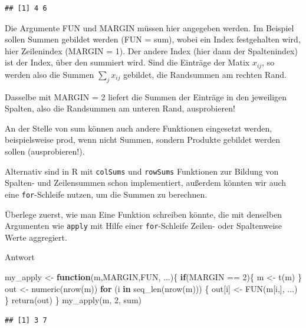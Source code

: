 \documentclass[
]{book}
\newenvironment{Shaded}{\begin{snugshade}}{\end{snugshade}}
\newcommand{\ControlFlowTok}[1]{\textcolor[rgb]{0.13,0.29,0.53}{\textbf{#1}}}
\newcommand{\DecValTok}[1]{\textcolor[rgb]{0.00,0.00,0.81}{#1}}
\newcommand{\FunctionTok}[1]{\textcolor[rgb]{0.00,0.00,0.00}{#1}}
\newcommand{\NormalTok}[1]{#1}
\newcommand{\OtherTok}[1]{\textcolor[rgb]{0.56,0.35,0.01}{#1}}
\newcommand{\SpecialCharTok}[1]{\textcolor[rgb]{0.00,0.00,0.00}{#1}}
\begin{document}
\begin{verbatim}
## [1] 4 6
\end{verbatim}

Die Argumente FUN und MARGIN müssen hier angegeben werden. Im Beispiel sollen Summen gebildet werden (FUN = sum), wobei ein Index festgehalten wird, hier Zeilenindex (MARGIN = 1). Der andere Index (hier dann der Spaltenindex) ist der Index, über den summiert wird. Sind die Einträge der Matix \(x_{ij}\), so werden also die Summen \(\sum_j x_{ij}\) gebildet, die Randsummen am rechten Rand.

Dasselbe mit MARGIN = 2 liefert die Summen der Einträge in den jeweiligen Spalten, also die Randsummen am unteren Rand, ausprobieren!

An der Stelle von sum können auch andere Funktionen eingesetzt werden, beispielsweise prod, wenn nicht Summen, sondern Produkte gebildet werden sollen (ausprobieren!).

Alternativ sind in R mit \texttt{colSums} und \texttt{rowSums} Funktionen zur Bildung von Spalten- und Zeilensummen schon implementiert, außerdem könnten wir auch eine \texttt{for}-Schleife nutzen, um die Summen zu berechnen.

Überlege zuerst, wie man Eine Funktion schreiben könnte, die mit denselben Argumenten wie \texttt{apply} mit Hilfe einer \texttt{for}-Schleife Zeilen- oder Spaltenweise Werte aggregiert.

Antwort

\begin{Shaded}
\begin{Highlighting}[]
\NormalTok{my\_apply }\OtherTok{\textless{}{-}} \ControlFlowTok{function}\NormalTok{(m,MARGIN,FUN, ...)\{}
  \ControlFlowTok{if}\NormalTok{(MARGIN }\SpecialCharTok{==} \DecValTok{2}\NormalTok{)\{}
\NormalTok{    m }\OtherTok{\textless{}{-}} \FunctionTok{t}\NormalTok{(m)}
\NormalTok{  \}}
\NormalTok{  out }\OtherTok{\textless{}{-}} \FunctionTok{numeric}\NormalTok{(}\FunctionTok{nrow}\NormalTok{(m))}
  \ControlFlowTok{for}\NormalTok{ (i }\ControlFlowTok{in} \FunctionTok{seq\_len}\NormalTok{(}\FunctionTok{nrow}\NormalTok{(m))) \{}
\NormalTok{    out[i] }\OtherTok{\textless{}{-}} \FunctionTok{FUN}\NormalTok{(m[i,], ...)}
\NormalTok{  \}}
  \FunctionTok{return}\NormalTok{(out)}
\NormalTok{\}}
\FunctionTok{my\_apply}\NormalTok{(m, }\DecValTok{2}\NormalTok{, sum)}
\end{Highlighting}
\end{Shaded}

\begin{verbatim}
## [1] 3 7
\end{verbatim}
\end{document}
